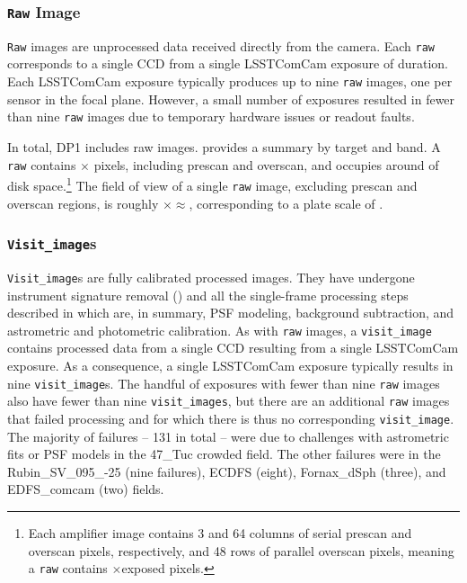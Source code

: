 \subsubsection{\texttt{Raw} Image}
\texttt{Raw} images \citep[][]{10.71929/rubin/2570310} are unprocessed data received directly from the camera.
Each \texttt{raw} corresponds to a single \gls{CCD} from a single \gls{LSSTComCam} exposure of \exposuretime duration.
Each \gls{LSSTComCam} exposure typically produces up to nine \texttt{raw} images, one per sensor in the focal plane.
However, a small number of exposures resulted in fewer than nine \texttt{raw} images due to temporary hardware issues or readout faults.

In total, \gls{DP1} includes \nraws raw images.
 provides a summary by target and band.
A \texttt{raw} contains \nrawpixx $\xspace\times\xspace$ \nrawpixy pixels, including prescan and overscan, and occupies around \rawhdd of disk space.\footnote{Each amplifier image contains 3 and 64 columns of serial prescan and overscan pixels, respectively, and 48 rows of parallel overscan pixels, meaning a \texttt{raw} contains \nvisitimagepixx$\xspace\times\xspace$\nvisitimagepixy exposed pixels.}
The field of view of a single \texttt{raw} image, excluding prescan and overscan regions, is roughly \visitimagefovx$\xspace\times\xspace$\visitimagefovy$\approx$\visitimagefov, corresponding to a plate scale of \rawplatescale.


\subsubsection{\texttt{Visit\_image}s}
\texttt{Visit\_image}s \citep[][]{10.71929/rubin/2570311} are fully calibrated processed images.
They have undergone instrument signature removal () and all the single-frame processing steps described in  which are, in summary, \gls{PSF} modeling, \gls{background} subtraction, and astrometric and photometric \gls{calibration}.
As with \texttt{raw} images, a \texttt{visit\_image} contains processed data from a single \gls{CCD} resulting from a single \exposuretime \gls{LSSTComCam} exposure.
As a consequence, a single \gls{LSSTComCam} exposure typically results in nine \texttt{visit\_image}s.
The handful of exposures with fewer than nine \texttt{raw} images also have fewer than nine \texttt{visit\_images}, but there are an additional \nsfpfails \texttt{raw} images that failed processing and for which there is thus no corresponding \texttt{visit\_image}.
The majority of failures -- 131 in total -- were due to challenges with astrometric fits or \gls{PSF} models in the 47\_Tuc crowded field. 
The other failures were in the Rubin\_SV\_095\_-25 (nine failures), ECDFS (eight), Fornax\_dSph (three), and EDFS\_comcam (two) fields.

